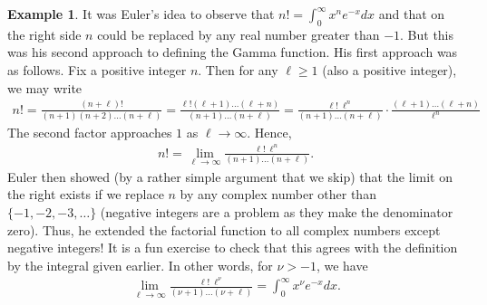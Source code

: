 \documentclass[preprint,  11pt]{amsart}
\newcommand{\para}[1]{\vspace{4mm}\noindent{\bfseries #1:}}
\theoremstyle{plain} %
\theoremstyle{definition} %
\newtheorem{example}[theorem]{Example}
\begin{document}
\begin{example}
{\para{A small digression} It was Euler's  idea to observe that $n!=\int_{0}^{\infty}x^{n}e^{-x}dx$ and that on the right side $n$ could be replaced by  any real number greater than $-1$. But this was his second approach to defining the Gamma function. His first approach was as follows. Fix a positive integer $n$. Then for any $\ell\ge 1$ (also a positive integer), we may write
\[\begin{aligned}
n!=\frac{(n+\ell)!}{(n+1)(n+2)\ldots (n+\ell)} = \frac{\ell!(\ell+1)\ldots (\ell+n)}{(n+1)\ldots (n+\ell)} = \frac{\ell! \ \ell^{n}}{(n+1)\ldots (n+\ell)}\cdot\frac{(\ell+1)\ldots (\ell+n)}{\ell^{n}}
\end{aligned}\] 
The second factor approaches $1$ as $\ell\rightarrow \infty$. Hence,
\[\begin{aligned}
n!=\lim_{\ell\rightarrow \infty}\frac{\ell! \ \ell^{n}}{(n+1)\ldots (n+\ell)}.
\end{aligned}\]
Euler then showed (by a rather simple argument that we skip) that the limit on the right exists if we replace $n$ by any complex number other than $\{-1,-2,-3,\ldots \}$ (negative integers are a problem as they make the denominator zero). Thus, he extended the factorial function to all complex numbers except negative integers! It is a fun exercise to check that this agrees with the definition by the integral given earlier. In other words, for $\nu>-1$, we have
\[\begin{aligned}
\lim_{\ell\rightarrow \infty}\frac{\ell! \ \ell^{\nu}}{(\nu+1)\ldots (\nu+\ell)}=\int_{0}^{\infty}x^{\nu}e^{-x}dx.
\end{aligned}\]
}
\end{example}
\end{document}
